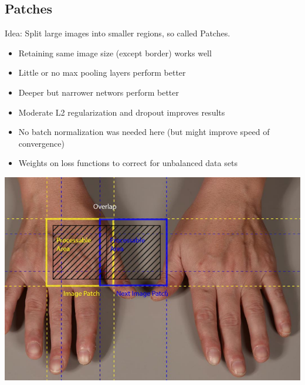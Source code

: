 \subsection{Patches}
\begin{minipage}{0.5\textwidth}
    Idea: Split large images into smaller regions, so called \glqq Patches\grqq.
    \begin{itemize}
        \item Retaining same image size (except border) works well
        \item Little or no max pooling layers perform better
        \item Deeper but \glqq narrower\grqq{} networs perform better
        \item Moderate L2 regularization and dropout improves results
        \item No batch normalization was needed here (but might improve speed of convergence)
        \item Weights on loss functions to correct for unbalanced data sets
    \end{itemize}
\end{minipage}
\begin{minipage}{0.49\textwidth}
    \includegraphics[width=1.0\textwidth]{sections/SemanticSegmentation/img/patches.png}
\end{minipage}

